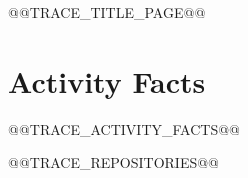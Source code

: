 \documentclass[10pt,a4paper]{article}
\begin{document}
@@TRACE_TITLE_PAGE@@

\section{Activity Facts}
@@TRACE_ACTIVITY_FACTS@@

@@TRACE_REPOSITORIES@@
\end{document}

